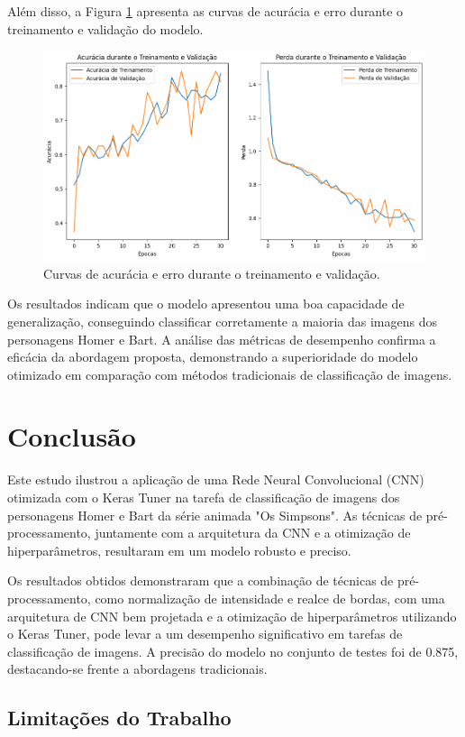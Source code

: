 \documentclass{article}
\begin{document}
Além disso, a Figura \ref{fig:acuracia_erro} apresenta as curvas de acurácia e erro durante o treinamento e validação do modelo.

\begin{figure}[h]
    \centering
    \includegraphics[width=0.6\linewidth]{imd_visao/imagens/acuracia_erro.png}
    \caption{\label{fig:acuracia_erro} Curvas de acurácia e erro durante o treinamento e validação.}
\end{figure}

Os resultados indicam que o modelo apresentou uma boa capacidade de generalização, conseguindo classificar corretamente a maioria das imagens dos personagens Homer e Bart. A análise das métricas de desempenho confirma a eficácia da abordagem proposta, demonstrando a superioridade do modelo otimizado em comparação com métodos tradicionais de classificação de imagens.

\section{Conclusão}

Este estudo ilustrou a aplicação de uma Rede Neural Convolucional (CNN) otimizada com o Keras Tuner na tarefa de classificação de imagens dos personagens Homer e Bart da série animada "Os Simpsons". As técnicas de pré-processamento, juntamente com a arquitetura da CNN e a otimização de hiperparâmetros, resultaram em um modelo robusto e preciso.

Os resultados obtidos demonstraram que a combinação de técnicas de pré-processamento, como normalização de intensidade e realce de bordas, com uma arquitetura de CNN bem projetada e a otimização de hiperparâmetros utilizando o Keras Tuner, pode levar a um desempenho significativo em tarefas de classificação de imagens. A precisão do modelo no conjunto de testes foi de 0.875, destacando-se frente a abordagens tradicionais.

\subsection{Limitações do Trabalho}
\end{document}

